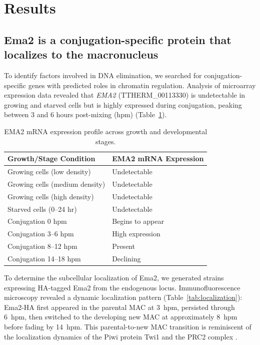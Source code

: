 \documentclass[11pt,a4paper]{article}
\begin{document}
\section{Results}

\subsection{Ema2 is a conjugation-specific protein that localizes to the macronucleus}

To identify factors involved in DNA elimination, we searched for conjugation-specific genes with predicted roles in chromatin regulation. Analysis of microarray expression data \citep{Miao2009} revealed that \textit{EMA2} (TTHERM\_00113330) is undetectable in growing and starved cells but is highly expressed during conjugation, peaking between 3 and 6 hours post-mixing (hpm) (Table~\ref{tab:expression}).

\begin{table}[htbp]
\centering
\caption{EMA2 mRNA expression profile across growth and developmental stages.}
\label{tab:expression}
\begin{tabular}{ll}
\toprule
\textbf{Growth/Stage Condition} & \textbf{EMA2 mRNA Expression} \\
\midrule
Growing cells (low density) & Undetectable \\
Growing cells (medium density) & Undetectable \\
Growing cells (high density) & Undetectable \\
Starved cells (0--24 hr) & Undetectable \\
Conjugation 0 hpm & Begins to appear \\
Conjugation 3--6 hpm & High expression \\
Conjugation 8--12 hpm & Present \\
Conjugation 14--18 hpm & Declining \\
\bottomrule
\end{tabular}
\end{table}

To determine the subcellular localization of Ema2, we generated strains expressing HA-tagged Ema2 from the endogenous locus. Immunofluorescence microscopy revealed a dynamic localization pattern (Table~\ref{tab:localization}): Ema2-HA first appeared in the parental MAC at 3~hpm, persisted through 6~hpm, then switched to the developing new MAC at approximately 8~hpm before fading by 14~hpm. This parental-to-new MAC transition is reminiscent of the localization dynamics of the Piwi protein Twi1 and the PRC2 complex \citep{Noto2015, Liu2007}.
\end{document}
